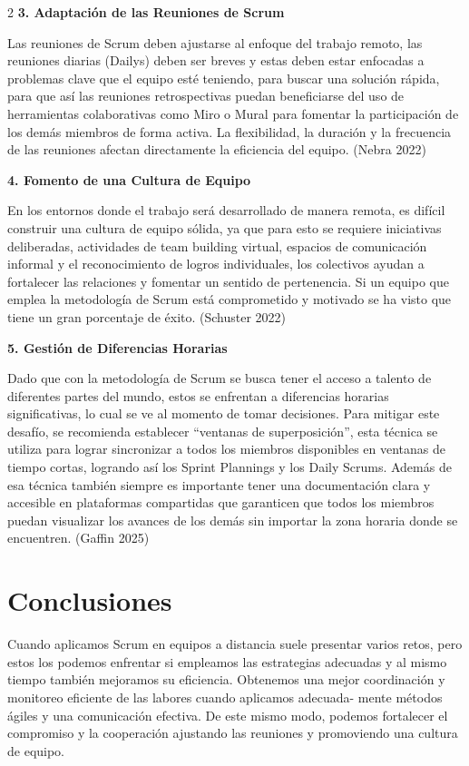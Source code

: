 \documentclass[12pt,spanish,Letterpaper,openany]{book}
\begin{document}
\begin {multicols}{2}
\textbf{3. Adaptación de las Reuniones de Scrum}

Las reuniones de Scrum deben ajustarse al enfoque del trabajo remoto, las reuniones
diarias (Dailys) deben ser breves y estas deben estar enfocadas a problemas clave que el
equipo esté teniendo, para buscar una solución rápida, para que así las reuniones
retrospectivas puedan beneficiarse del uso de herramientas colaborativas como Miro o Mural
para fomentar la participación de los demás miembros de forma activa. La flexibilidad, la
duración y la frecuencia de las reuniones afectan directamente la eficiencia del equipo.
(Nebra 2022)

\textbf{4. Fomento de una Cultura de Equipo}

En los entornos donde el trabajo será desarrollado de manera remota, es difícil
construir una cultura de equipo sólida, ya que para esto se requiere iniciativas deliberadas,
actividades de team building virtual, espacios de comunicación informal y el reconocimiento
de logros individuales, los colectivos ayudan a fortalecer las relaciones y fomentar un sentido de pertenencia. Si un equipo que emplea la metodología de Scrum está comprometido y
motivado se ha visto que tiene un gran porcentaje de éxito. (Schuster 2022)

\textbf{5. Gestión de Diferencias Horarias}

Dado que con la metodología de Scrum se busca tener el acceso a talento de diferentes
partes del mundo, estos se enfrentan a diferencias horarias significativas, lo cual se ve al
momento de tomar decisiones. Para mitigar este desafío, se recomienda establecer ``ventanas
de superposición'', esta técnica se utiliza para lograr sincronizar a todos los miembros
disponibles en ventanas de tiempo cortas, logrando así los Sprint Plannings y los Daily
Scrums. Además de esa técnica también siempre es importante tener una documentación
clara y accesible en plataformas compartidas que garanticen que todos los miembros puedan
visualizar los avances de los demás sin importar la zona horaria donde se encuentren. (Gaffin
2025)

\hypertarget{conclusiones-2}{%
\section{Conclusiones}\label{conclusiones-2}}

Cuando aplicamos Scrum en equipos a distancia suele presentar varios retos, pero estos los
podemos enfrentar si empleamos las estrategias adecuadas y al mismo tiempo también
mejoramos su eficiencia. Obtenemos una mejor coordinación y monitoreo eficiente de las
labores cuando aplicamos adecuada-
mente métodos ágiles y una comunicación efectiva. De
este mismo modo, podemos fortalecer el compromiso y la cooperación ajustando las
reuniones y promoviendo una cultura de equipo.


\end{multicols}
\end{document}
